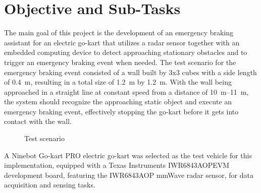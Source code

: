 \section{Objective and Sub-Tasks}
\label{sec:objective}
The main goal of this project is the development of an emergency braking assistant for an electric go-kart that utilizes a radar sensor together with an embedded computing device to detect approaching stationary obstacles and to trigger an emergency braking event when needed.
The test scenario for the emergency braking event consisted of a wall built by 3x3 cubes with a side length of \SI{0.4}{\meter}, resulting in a total size of \SI{1.2}{\meter} by \SI{1.2}{\meter}.
With the wall being approached in a straight line at constant speed from a distance of \SIrange{10}{11}{\meter}, the system should recognize the approaching static object and execute an emergency braking event, effectively stopping the go-kart before it gets into contact with the wall.

\begin{figure}[!htbp]
    \centering
    \caption{Test scenario}
    \label{fig:test_scenario}
\end{figure}
\par
A Ninebot Go-kart PRO electric go-kart was selected as the test vehicle for this implementation, equipped with a Texas Instruments IWR6843AOPEVM development board, featuring the IWR6843AOP mmWave radar sensor, for data acquisition and sensing tasks.
\newpage

